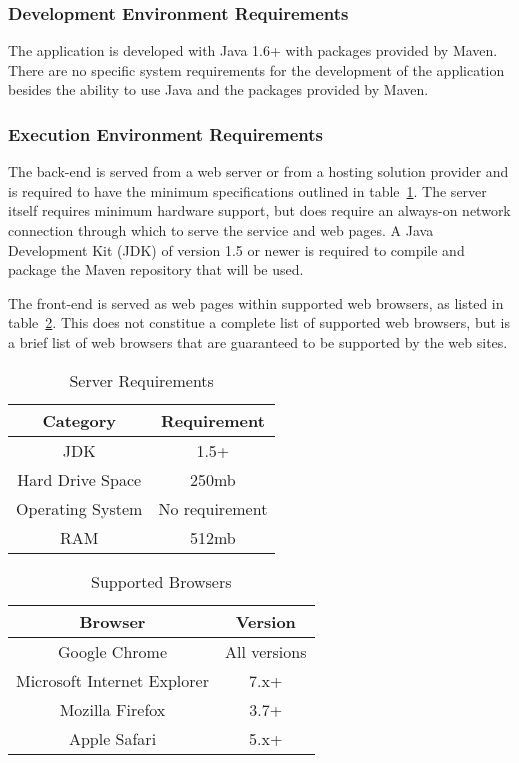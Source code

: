 \documentclass{article}
\begin{document}
\subsubsection{Development Environment Requirements}

The application is developed with Java 1.6+ with packages provided by
Maven.  There are no specific system requirements for the development of
the application besides the ability to use Java and the packages provided
by Maven.

\subsubsection{Execution Environment Requirements}

The back-end is served from a web server or from a hosting solution provider and is
required to have the minimum specifications outlined in table~\ref{server}.  The
server itself requires minimum hardware support, but does require an always-on
network connection through which to serve the service and web pages.  A Java
Development Kit (JDK) of version 1.5 or newer is required to compile and package
the Maven repository that will be used.

The front-end is served as web pages within supported web browsers, as listed in
table~\ref{browsers}.  This does not constitue a complete list of supported web
browsers, but is a brief list of web browsers that are guaranteed to be supported
by the web sites.

\begin{table}
    \centering
    \begin{tabular}{|c|c|}\hline
        Category & Requirement \\\hline\hline
        JDK & 1.5+ \\\hline
        Hard Drive Space & 250mb \\\hline
        Operating System & No requirement \\\hline
        RAM & 512mb \\\hline
    \end{tabular}
    \caption{Server Requirements}
    \label{server}
\end{table}

\begin{table}
    \centering
    \begin{tabular}{|c|c|}\hline
        Browser & Version \\\hline\hline
        Google Chrome & All versions  \\\hline
        Microsoft Internet Explorer & 7.x+ \\\hline
        Mozilla Firefox & 3.7+ \\\hline
        Apple Safari & 5.x+ \\\hline
    \end{tabular}
    \caption{Supported Browsers}
    \label{browsers}
\end{table}
\end{document}
